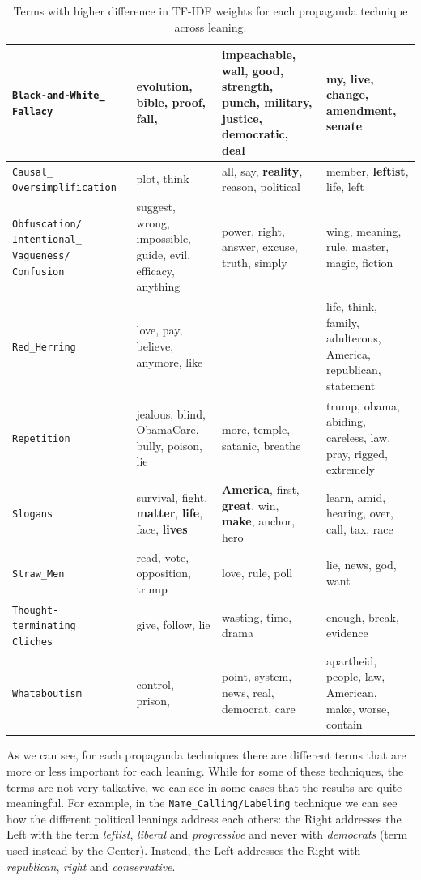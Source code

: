 \begin{table}[!htbp]
{\begin{tabular}{p{}|p{}|p{}|p{}}
         \hline
         \texttt{Black-and-White\_ Fallacy} & evolution, bible, proof, fall,  & impeachable, wall, good, strength, punch, military, justice, democratic, deal & my, live, change, amendment, senate \\
         \hline
         \texttt{Causal\_ Oversimplification} & plot, think & all, say, \textbf{reality}, reason, political & member, \textbf{leftist}, life, left  \\
         \hline
         \texttt{Obfuscation/ Intentional\_ Vagueness/ Confusion} & suggest, wrong, impossible, guide, evil, efficacy, anything & power, right, answer, excuse, truth, simply  & wing, meaning, rule, master, magic, fiction \\
         \hline
         \texttt{Red\_Herring} & love, pay, believe, anymore, like & & life, think, family, adulterous, America, republican, statement  \\
         \hline
         \texttt{Repetition} & jealous, blind, ObamaCare, bully, poison, lie  & more, temple, satanic, breathe & trump, obama, abiding, careless, law, pray, rigged, extremely  \\
         \hline
         \texttt{Slogans} & survival, fight, \textbf{matter}, \textbf{life}, face, \textbf{lives} & \textbf{America}, first, \textbf{great}, win, \textbf{make}, anchor, hero  & learn, amid, hearing, over, call, tax, race  \\
         \hline
         \texttt{Straw\_Men} & read, vote, opposition, trump & love, rule, poll & lie, news, god, want \\
         \hline
         \texttt{Thought-terminating\_ Cliches} & give, follow, lie  & wasting, time, drama & enough, break, evidence \\
         \hline
         \texttt{Whataboutism} & control, prison, & point, system, news, real, democrat, care  & apartheid, people, law, American, make, worse, contain \\
    \end{tabular}
}
    \caption{Terms with higher difference in TF-IDF weights for each propaganda technique across leaning.}
    \label{tab:prop_words_by_technique_and_leaning}
\end{table}

As we can see, for each propaganda techniques there are different terms that are more or less important for each leaning. While for some of these techniques, the terms are not very talkative, we can see in some cases that the results are quite meaningful.
For example, in the \texttt{Name\_Calling/Labeling} technique we can see how the different political leanings address each others: the Right addresses the Left with the term \emph{leftist}, \emph{liberal} and \emph{progressive} and never with \emph{democrats} (term used instead by the Center). Instead, the Left addresses the Right with \emph{republican}, \emph{right} and \emph{conservative}.

